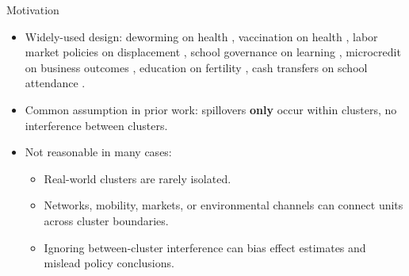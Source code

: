\documentclass[aspectratio=169]{beamer}
\begin{document}

\begin{frame}{Motivation}
\begin{itemize}
    \item Widely-used design: deworming on health \citep{miguel2004worms}, vaccination on health \citep{ali2005herd}, labor market policies on displacement \citep{crepon2013labor}, school governance on learning \citep{pradhan2014improving}, microcredit on business outcomes \citep{banerjee2015miracle}, education on fertility \citep{duflo2015education}, cash transfers on school attendance \citep{barrera2019long}.
    \pause
    \item Common assumption in prior work: spillovers \textbf{only} occur within clusters, no interference between clusters.
    \pause
    \item Not reasonable in many cases:
    \begin{itemize}
      \item Real-world clusters are rarely isolated.
      \item Networks, mobility, markets, or environmental channels can connect units across cluster boundaries.
      \item Ignoring between-cluster interference can bias effect estimates and mislead policy conclusions.
    \end{itemize} 
\end{itemize}
\end{frame}
\end{document}
